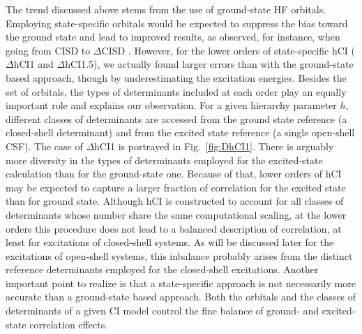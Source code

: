 \documentclass[aip,jcp,reprint,noshowkeys,superscriptaddress]{revtex4-1}
\begin{document}
The trend discussed above stems from the use of ground-state HF orbitals.
Employing state-specific orbitals would be expected to suppress the bias toward the ground state and lead to improved results, as observed, for instance, when going from CISD to $\Delta$CISD \cite{Kossoski_2023}.
However, for the lower orders of state-specific hCI ($\Delta$hCI1 and $\Delta$hCI1.5), we actually found larger errors than with the ground-state based approach, though by underestimating the excitation energies.
Besides the set of orbitals, the types of determinants included at each order play an equally important role and explains our observation.
For a given hierarchy parameter $h$, different classes of determinants are accessed from the ground state reference (a closed-shell determinant) and from the excited state reference (a single open-shell CSF).
The case of $\Delta$hCI1 is portrayed in Fig.~\ref{fig:DhCI1}.
There is arguably more diversity in the types of determinants employed for the excited-state calculation than for the ground-state one.
Because of that, lower orders of hCI may be expected to capture a larger fraction of correlation for the excited state than for ground state.
Although hCI is constructed to account for all classes of determinants whose number share the same computational scaling,
at the lower orders this procedure does not lead to a balanced description of correlation, at least for excitations of closed-shell systems.
As will be discussed later for the excitations of open-shell systems, this inbalance probably arises from the distinct reference determinants employed for the closed-shell excitations.
%
Another important point to realize is that a state-specific approach is not necessarily more accurate than a ground-state based approach.
Both the orbitals and the classes of determinants of a given CI model control the fine balance of ground- and excited-state correlation effects.

\end{document}
